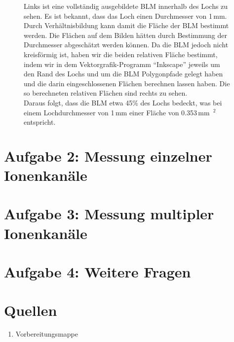 \documentclass[a4paper,ngerman]{scrartcl}
\begin{document}
\begin{figure}[tbh!]
\begin{minipage}[b]{.4\textwidth}
  \end{minipage}
  \caption{Links ist eine vollständig ausgebildete BLM innerhalb des Lochs zu sehen.
Es ist bekannt, dass das Loch einen Durchmesser von 1\,mm. Durch Verhältnisbildung kann damit die Fläche 
der BLM bestimmt werden. Die Flächen auf dem Bilden hätten durch Bestimmung der Durchmesser abgeschätzt werden können. Da die BLM jedoch
nicht kreisförmig ist, haben wir die beiden relativen Fläche bestimmt, indem wir in dem Vektorgrafik-Programm "`Inkscape"'
jeweils um den Rand des Lochs und um die BLM Polygonpfade gelegt haben und die darin eingeschlossenen Flächen berechnen lassen haben. Die so 
berechneten relativen Flächen sind rechts zu sehen.\\
Daraus folgt, dass die BLM etwa 45\% des Lochs bedeckt, was bei einem Lochdurchmesser von 1\,mm einer Fläche von 0.353\,mm~$^2$ entspricht.}
\end{figure}

\section{Aufgabe 2: Messung einzelner Ionenkanäle}

\section{Aufgabe 3: Messung multipler Ionenkanäle}

\section{Aufgabe 4: Weitere Fragen}

\section{Quellen}
\begin{enumerate}
\item Vorbereitungsmappe 
\end{enumerate}
\end{document}
